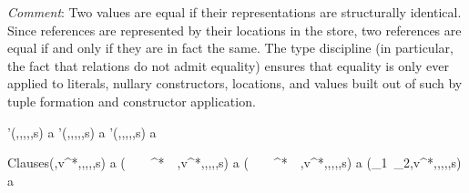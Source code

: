 \par\noindent\emph{Comment}:  Two values are equal if
their representations are structurally identical. Since references are represented
by their locations in the store, two references are equal if and only if they are
in fact the same.
The type discipline (in particular, the fact that relations do not
admit equality) ensures that equality is only ever applied to literals,
nullary constructors, locations, and values built out of such by tuple
formation and constructor application.

\begin{relation}{}{'(\langle{}\rangle,\ME,\VE,,,s) \Rightarrow a}
	{'(,\ME,\VE,,,s) \Rightarrow a}
\rruleskip
{}
	{'(\EMPTY,\ME,\VE,,,s) \Rightarrow a}
\end{relation}

\begin{relation}{Clauses}{(,v^{*},\ME,\VE,,,s) \Rightarrow a}
	{(~\langle{}\rangle~\mtt{{-}{-}}~\rmunder~^{*}~\mtt{=>}~,v^{*},\ME,\VE,,,s) \Rightarrow a}
\rruleskip
{}
	{(~\langle{}\rangle~\mtt{{-}{-}}~\rmunder~^{*}~\mtt{=>}~,v^{*},\ME,\VE,,,s) \Rightarrow a}
\rruleskip
{}
	{(_1~_2,v^{*},\ME,\VE,,,s) \Rightarrow a}
\end{relation}

